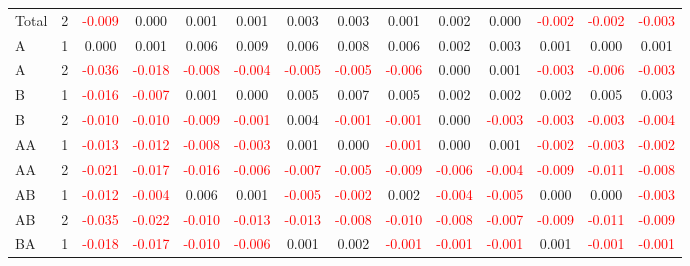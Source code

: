 \begin{table}[H]
{\begin{tabular}{llcccccccccccc}
Total & 2 & \textcolor{red}{-0.009} & 0.000 & 0.001 & 0.001 & 0.003 & 0.003 & 0.001 & 0.002 & 0.000 & \textcolor{red}{-0.002} & \textcolor{red}{-0.002} & \textcolor{red}{-0.003}\\
A & 1 & 0.000 & 0.001 & 0.006 & 0.009 & 0.006 & 0.008 & 0.006 & 0.002 & 0.003 & 0.001 & 0.000 & 0.001\\
A & 2 & \textcolor{red}{-0.036} & \textcolor{red}{-0.018} & \textcolor{red}{-0.008} & \textcolor{red}{-0.004} & \textcolor{red}{-0.005} & \textcolor{red}{-0.005} & \textcolor{red}{-0.006} & 0.000 & 0.001 & \textcolor{red}{-0.003} & \textcolor{red}{-0.006} & \textcolor{red}{-0.003}\\
B & 1 & \textcolor{red}{-0.016} & \textcolor{red}{-0.007} & 0.001 & 0.000 & 0.005 & 0.007 & 0.005 & 0.002 & 0.002 & 0.002 & 0.005 & 0.003\\
B & 2 & \textcolor{red}{-0.010} & \textcolor{red}{-0.010} & \textcolor{red}{-0.009} & \textcolor{red}{-0.001} & 0.004 & \textcolor{red}{-0.001} & \textcolor{red}{-0.001} & 0.000 & \textcolor{red}{-0.003} & \textcolor{red}{-0.003} & \textcolor{red}{-0.003} & \textcolor{red}{-0.004}\\
AA & 1 & \textcolor{red}{-0.013} & \textcolor{red}{-0.012} & \textcolor{red}{-0.008} & \textcolor{red}{-0.003} & 0.001 & 0.000 & \textcolor{red}{-0.001} & 0.000 & 0.001 & \textcolor{red}{-0.002} & \textcolor{red}{-0.003} & \textcolor{red}{-0.002}\\
AA & 2 & \textcolor{red}{-0.021} & \textcolor{red}{-0.017} & \textcolor{red}{-0.016} & \textcolor{red}{-0.006} & \textcolor{red}{-0.007} & \textcolor{red}{-0.005} & \textcolor{red}{-0.009} & \textcolor{red}{-0.006} & \textcolor{red}{-0.004} & \textcolor{red}{-0.009} & \textcolor{red}{-0.011} & \textcolor{red}{-0.008}\\
AB & 1 & \textcolor{red}{-0.012} & \textcolor{red}{-0.004} & 0.006 & 0.001 & \textcolor{red}{-0.005} & \textcolor{red}{-0.002} & 0.002 & \textcolor{red}{-0.004} & \textcolor{red}{-0.005} & 0.000 & 0.000 & \textcolor{red}{-0.003}\\
AB & 2 & \textcolor{red}{-0.035} & \textcolor{red}{-0.022} & \textcolor{red}{-0.010} & \textcolor{red}{-0.013} & \textcolor{red}{-0.013} & \textcolor{red}{-0.008} & \textcolor{red}{-0.010} & \textcolor{red}{-0.008} & \textcolor{red}{-0.007} & \textcolor{red}{-0.009} & \textcolor{red}{-0.011} & \textcolor{red}{-0.009}\\
BA & 1 & \textcolor{red}{-0.018} & \textcolor{red}{-0.017} & \textcolor{red}{-0.010} & \textcolor{red}{-0.006} & 0.001 & 0.002 & \textcolor{red}{-0.001} & \textcolor{red}{-0.001} & \textcolor{red}{-0.001} & 0.001 & \textcolor{red}{-0.001} & \textcolor{red}{-0.001}\\

\end{tabular}}
\end{table}
